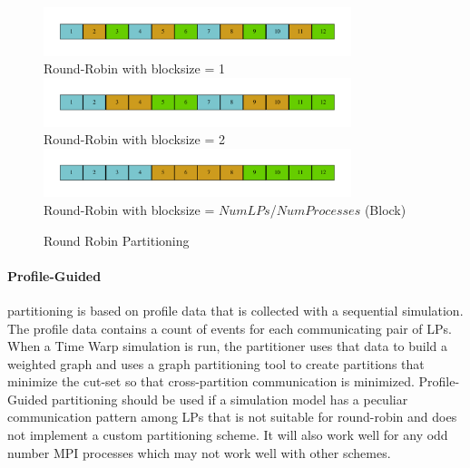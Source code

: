 \documentclass[11pt]{book}
\begin{document}
\begin{figure}
  \begin{center}
    \includegraphics[width=0.8\textwidth,keepaspectratio,quiet]{figs/graphviz/round_robin_partitioning.pdf} \\
    Round-Robin with blocksize = 1 \\
    \includegraphics[width=0.8\textwidth,keepaspectratio,quiet]{figs/graphviz/block_rr_partitioning.pdf} \\
    Round-Robin with blocksize = 2 \\
    \includegraphics[width=0.8\textwidth,keepaspectratio,quiet]{figs/graphviz/block_partitioning.pdf} \\
    Round-Robin with blocksize = $NumLPs$/$NumProcesses$ (Block) \\
  \end{center}
  \caption{Round Robin Partitioning}\label{round_robin_partitioning}
\end{figure}

\paragraph{Profile-Guided} partitioning is based on profile data that is collected with a
sequential simulation.  The profile data contains a count of events for each communicating pair
of LPs.  When a Time Warp simulation is run, the partitioner uses that data to build a weighted
graph and uses a graph partitioning tool to create partitions that minimize the cut-set so that
cross-partition communication is minimized.  Profile-Guided partitioning should be used if
a simulation model has a peculiar communication pattern among LPs that is not suitable for round-robin
and does not implement a custom partitioning scheme.  It will also work well for any odd number
MPI processes which may not work well with other schemes.
\end{document}
